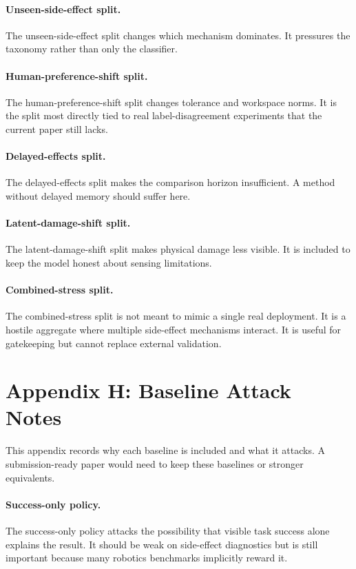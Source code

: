 \documentclass{article}
\begin{document}
\paragraph{Unseen-side-effect split.}
The unseen-side-effect split changes which mechanism dominates. It pressures the taxonomy rather than only the classifier.

\paragraph{Human-preference-shift split.}
The human-preference-shift split changes tolerance and workspace norms. It is the split most directly tied to real label-disagreement experiments that the current paper still lacks.

\paragraph{Delayed-effects split.}
The delayed-effects split makes the comparison horizon insufficient. A method without delayed memory should suffer here.

\paragraph{Latent-damage-shift split.}
The latent-damage-shift split makes physical damage less visible. It is included to keep the model honest about sensing limitations.

\paragraph{Combined-stress split.}
The combined-stress split is not meant to mimic a single real deployment. It is a hostile aggregate where multiple side-effect mechanisms interact. It is useful for gatekeeping but cannot replace external validation.

\clearpage
\section*{Appendix H: Baseline Attack Notes}
This appendix records why each baseline is included and what it attacks. A submission-ready paper would need to keep these baselines or stronger equivalents.

\paragraph{Success-only policy.}
The success-only policy attacks the possibility that visible task success alone explains the result. It should be weak on side-effect diagnostics but is still important because many robotics benchmarks implicitly reward it.
\end{document}
